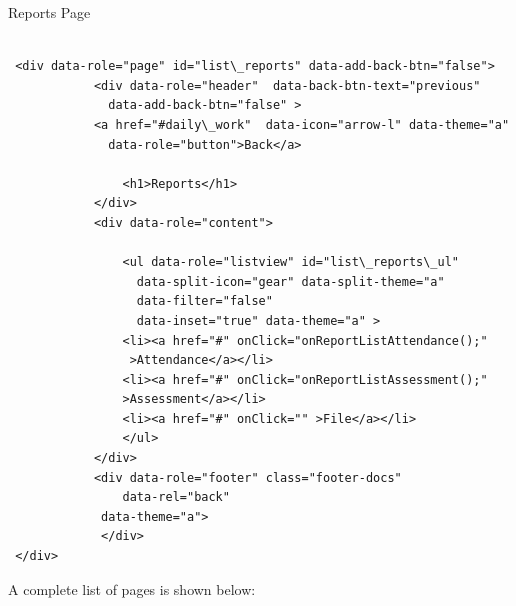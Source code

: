 \begin{bclogo}[couleur=blue!30,arrondi=0.1,ombre=true ] 
{Reports Page}
\begin{verbatim}
  
 <div data-role="page" id="list\_reports" data-add-back-btn="false">
            <div data-role="header"  data-back-btn-text="previous" 
              data-add-back-btn="false" >
            <a href="#daily\_work"  data-icon="arrow-l" data-theme="a" 
              data-role="button">Back</a>

                <h1>Reports</h1>
            </div>
            <div data-role="content">

                <ul data-role="listview" id="list\_reports\_ul" 
                  data-split-icon="gear" data-split-theme="a" 
                  data-filter="false" 
                  data-inset="true" data-theme="a" >
                <li><a href="#" onClick="onReportListAttendance();"
                 >Attendance</a></li>
                <li><a href="#" onClick="onReportListAssessment();" 
                >Assessment</a></li>
                <li><a href="#" onClick="" >File</a></li>
                </ul>
            </div>
            <div data-role="footer" class="footer-docs" 
                data-rel="back"
             data-theme="a">
             </div>
 </div>
\end{verbatim}

\end{bclogo}

A complete list of pages is shown below:

